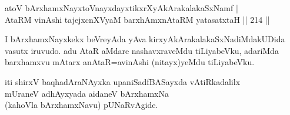 \begin{shl}
atoV bArxhamxNayxtoV\s nayxdayxtikxrXyAkArakalakaSxNamf |\\
AtaRM vinAshi tajejxcnXVyaM barxhAmxnAtaRM yatasatxtaH \hfill || 214 ||
\end{shl}

\begin{artha}
I bArxhamxNayxkekx beVreyAda yAva kirxyAkArakalakaSxNadiMda\break kUDida vasutx iruvudo. adu AtaR aMdare nashavxraveMdu tiLiyabeVku, adariMda barxhamxvu mAtarx anAtaR=avinAshi (nitayx)yeMdu tiLiyabeVku. 
\end{artha}

\begin{center}
iti shirxV baqhadAraNAyxka upaniSadfBASayxda vAtiRkadalilx\\ mUraneV adhAyxyada aidaneV bArxhamxNa \\(kahoVla bArxhamxNavu) pUNaRvAgide.
\end{center}
